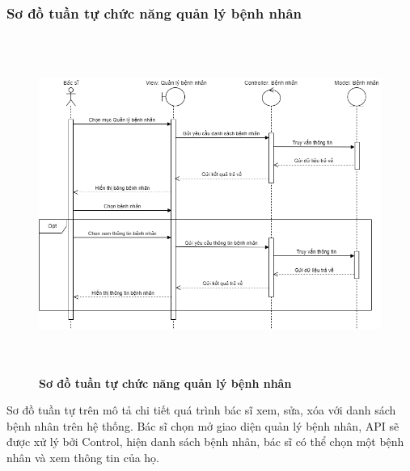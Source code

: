 \subsubsection{Sơ đồ tuần tự chức năng quản lý bệnh nhân}
\begin{figure}[H]
  \centering
  \includegraphics[width=14cm,height=11cm]{Images/sequence/sequence_manage_patient.png}
  \caption[Sơ đồ tuần tự chức năng quản lý bệnh nhân]{\bfseries \fontsize{12pt}{0pt}
  \selectfont Sơ đồ tuần tự chức năng quản lý bệnh nhân}
  \label{sequence_manage_patient} %
\end{figure}
Sơ đồ tuần tự trên mô tả chi tiết quá trình bác sĩ xem, sửa, xóa với danh sách bệnh nhân trên hệ thống. Bác sĩ chọn mở giao diện quản lý bệnh nhân, 
API sẽ được xử lý bởi Control, hiện danh sách bệnh nhân, bác sĩ có thể chọn một bệnh nhân và xem thông tin của họ. 
